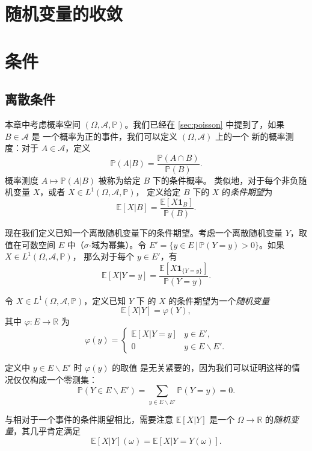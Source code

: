\documentclass[fontset=none]{Notes}
\newcommand{\indicator}[1]{\mathbold 1_{#1}}
\begin{document}
\chapter{随机变量的收敛}


\chapter{条件}\label{chap:condition}

\section{离散条件}

本章中考虑概率空间 $(\Omega,\mathcal{A},\mathbb{P})$。我们已经在
\autoref{sec:poisson} 中提到了，如果 $B\in \mathcal{A}$ 是
一个概率为正的事件，我们可以定义 $(\Omega,\mathcal{A})$ 上的一个
新的概率测度：对于 $A\in \mathcal{A}$，定义
\[
  \mathbb{P}(A|B)=\frac{\mathbb{P}(A\cap B)}{\mathbb{P}(B)}.  
\]
概率测度 $A\mapsto \mathbb{P}(A|B)$ 被称为给定 $B$ 下的条件概率。
类似地，对于每个非负随机变量 $X$，或者 $X\in L^1(\Omega,\mathcal{A},\mathbb{P})$，
定义给定 $B$ 下的 $X$ 的\emph{条件期望}为
\[
  \mathbb{E}[X|B]=\frac{\mathbb{E}[X\indicator{B}]}{\mathbb{P}(B)}.  
\]

现在我们定义已知一个离散随机变量下的条件期望。考虑一个离散随机变量
$Y$，取值在可数空间 $E$ 中（$\sigma$-域为幂集）。令
$E'=\{y\in E\,|\, \mathbb{P}(Y=y)>0\}$。如果 $X\in L^1(\Omega,\mathcal{A},\mathbb{P})$，
那么对于每个 $y\in E'$，有
\[
  \mathbb{E}[X|Y=y]=\frac{\mathbb{E}[X\indicator{\{Y=y\}}]}{\mathbb{P}(Y=y)}.
\]

\begin{definition}
  令 $X\in L^1(\Omega,\mathcal{A},\mathbb{P})$，定义已知 $Y$ 下
  的 $X$ 的条件期望为一个\emph{随机变量}
  \[
    \mathbb{E}[X|Y]=\varphi(Y),  
  \]
  其中 $\varphi:E\to \mathbb{R}$ 为
  \[
    \varphi(y)=\begin{cases}
      \mathbb{E}[X|Y=y] & y\in E',\\
      0 & y\in E\smallsetminus E'.
    \end{cases}
  \] 
\end{definition}
\begin{remark}
  定义中 $y\in E \smallsetminus E'$ 时 $\varphi(y)$ 的取值
  是无关紧要的，因为我们可以证明这样的情况仅仅构成一个零测集：
  \[
    \mathbb{P}(Y\in E \smallsetminus E')=
    \sum_{y\in E \smallsetminus E'}\mathbb{P}(Y=y)
    =0.
  \]
\end{remark}

与相对于一个事件的条件期望相比，需要注意 $\mathbb{E}[X|Y]$
是一个 $\Omega\to \mathbb{R}$ 的\emph{随机变量}，其几乎肯定满足
\[
  \mathbb{E}[X|Y](\omega)=\mathbb{E}[X|Y=Y(\omega)].  
\]
\end{document}

